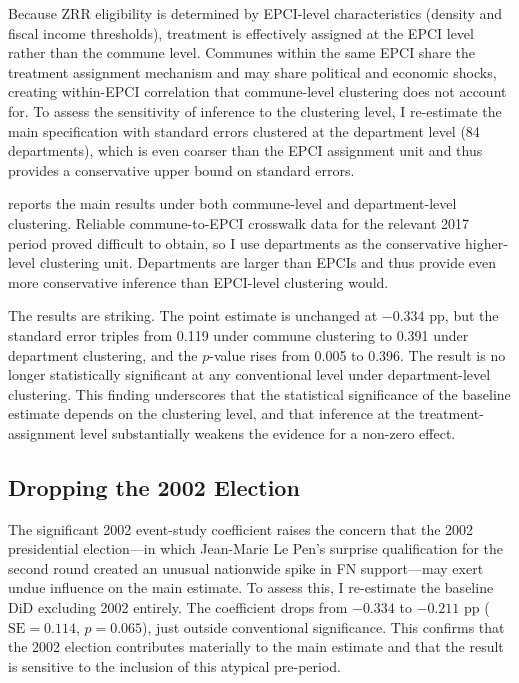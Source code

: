 \documentclass[12pt]{article}
\begin{document}
Because ZRR eligibility is determined by EPCI-level characteristics (density and fiscal income thresholds), treatment is effectively assigned at the EPCI level rather than the commune level. Communes within the same EPCI share the treatment assignment mechanism and may share political and economic shocks, creating within-EPCI correlation that commune-level clustering does not account for. To assess the sensitivity of inference to the clustering level, I re-estimate the main specification with standard errors clustered at the department level (84 departments), which is even coarser than the EPCI assignment unit and thus provides a conservative upper bound on standard errors.

 reports the main results under both commune-level and department-level clustering. Reliable commune-to-EPCI crosswalk data for the relevant 2017 period proved difficult to obtain, so I use departments as the conservative higher-level clustering unit. Departments are larger than EPCIs and thus provide even more conservative inference than EPCI-level clustering would.

The results are striking. The point estimate is unchanged at $-0.334$ pp, but the standard error triples from 0.119 under commune clustering to 0.391 under department clustering, and the $p$-value rises from 0.005 to 0.396. The result is no longer statistically significant at any conventional level under department-level clustering. This finding underscores that the statistical significance of the baseline estimate depends on the clustering level, and that inference at the treatment-assignment level substantially weakens the evidence for a non-zero effect.



\subsection{Dropping the 2002 Election}

The significant 2002 event-study coefficient raises the concern that the 2002 presidential election---in which Jean-Marie Le Pen's surprise qualification for the second round created an unusual nationwide spike in FN support---may exert undue influence on the main estimate. To assess this, I re-estimate the baseline DiD excluding 2002 entirely. The coefficient drops from $-0.334$ to $-0.211$ pp ($\text{SE} = 0.114$, $p = 0.065$), just outside conventional significance. This confirms that the 2002 election contributes materially to the main estimate and that the result is sensitive to the inclusion of this atypical pre-period.
\end{document}
